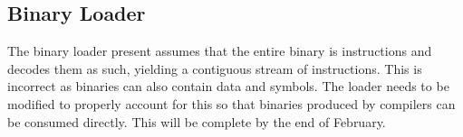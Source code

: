 \subsection{Binary Loader}

The binary loader present assumes that the entire binary is instructions and decodes them as such, yielding a contiguous stream of instructions. This is incorrect as binaries can also contain data and symbols. The loader needs to be modified to properly account for this so that binaries produced by compilers can be consumed directly. This will be complete by the end of February.